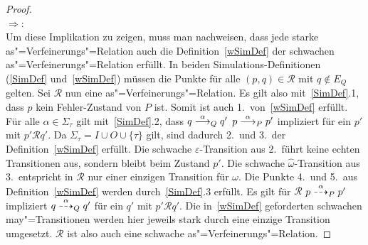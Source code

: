 \begin{proof}\mbox{}\\
  \glqq $\Rightarrow$\grqq{}:\\
  Um diese Implikation zu zeigen, muss man nachweisen, dass jede starke
  as"=Verfeinerungs"=Relation auch die Definition~\ref{wSimDef} der schwachen
  as"=Verfeinerungs"=Relation erfüllt. In beiden Simulations-Definitionen
  (\ref{SimDef} und~\ref{wSimDef}) müssen die Punkte für alle $(p,q) \in
  \mathcal{R}$ mit $q\notin E_Q$ gelten. Sei $\mathcal{R}$ nun eine
  as"=Verfeinerungs"=Relation. Es gilt also mit~\ref{SimDef}.1, dass $p$ kein
  Fehler-Zustand von $P$ ist. Somit ist auch 1.\ von~\ref{wSimDef} erfüllt. Für
  alle $\alpha\in\Sigma _{\tau}$ gilt mit~\ref{SimDef}.2, dass $q
  \must[\alpha]_Q q'$ $p\must[\alpha]_P p'$ impliziert für ein $p'$ mit
  $p'\mathcal{R} q'$. Da $\Sigma _{\tau} = I \cup O \cup \{\tau\}$ gilt, sind
  dadurch 2.\ und 3.\ der Definition~\ref{wSimDef} erfüllt. Die schwache
  $\varepsilon$-Transition aus 2.\ führt keine echten Transitionen aus, sondern
  bleibt beim Zustand $p'$. Die schwache $\hat{\omega}$-Transition aus 3.\
  entspricht in $\mathcal{R}$ nur einer einzigen Transition für $\omega$. Die
  Punkte 4.\ und 5.\ aus Definition~\ref{wSimDef} werden durch~\ref{SimDef}.3
  erfüllt. Es gilt für $\mathcal{R}$ $p\may[\alpha]_P p'$ impliziert $q
  \may[\alpha]_Q q'$ für ein $q'$ mit $p'\mathcal{R}q'$. Die in~\ref{wSimDef}
  geforderten schwachen may"=Transitionen werden hier jeweils stark durch eine
  einzige Transition umgesetzt. $\mathcal{R}$ ist also auch eine schwache
  as"=Verfeinerungs"=Relation.


\end{proof}
